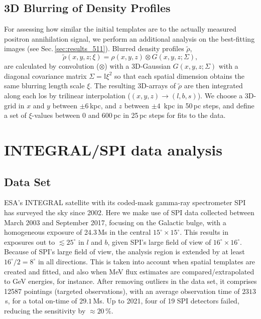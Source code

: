 \documentclass[doublespace,nopageskip]{VTthesis}
\begin{document}
\subsection{3D Blurring of Density Profiles}\label{sec:blurring_maps}
%
For assessing how similar the initial templates are to the actually measured positron annihilation signal, we perform an additional analysis on the best-fitting images (see Sec.\,\ref{sec:results_511}).
%
Blurred density profiles $\tilde{\rho}$,
%
\begin{equation}
	\tilde{\rho}(x,y,z;\xi) = \rho(x,y,z) \otimes G(x,y,z;\Sigma)\mathrm{,} 
	\label{eq:3Dblurring}
\end{equation}
%
\noindent are calculated by convolution ($\otimes$) with a 3D-Gaussian  $G(x,y,z;\Sigma)$ with a diagonal covariance matrix $\Sigma = \mathbb{I}\xi^2$ so that each spatial dimension obtains the same blurring length scale $\xi$.
%
The resulting 3D-arrays of $\tilde{\rho}$ are then integrated along each los by trilinear interpolation ($(x,y,z) \rightarrow (l,b,s)$).
%
We choose a 3D-grid in $x$ and $y$ between $\pm 6$\,kpc, and $z$ between $\pm 4$\, kpc in 50\,pc steps, and define a set of $\xi$-values between 0 and 600\,pc in 25\,pc steps for fits to the data.




\section{INTEGRAL/SPI data analysis}\label{sec:data_analysis}
%
\subsection{Data Set}\label{sec:data_set}
%
ESA's INTEGRAL satellite \citep{2003A&A...411L...1W} with its coded-mask gamma-ray spectrometer SPI \citep{2003A&A...411L..63V} has surveyed the sky since 2002. 
%
Here we make use of SPI data collected between March 2003 and September 2017, focusing on the Galactic bulge, with a homogeneous exposure of 24.3\,Ms in the central $15^{\circ} \times 15^{\circ}$.
%
This results in exposures out to $\lesssim 25^{\circ}$ in $l$ and $b$, given SPI's large field of view of $16^{\circ} \times 16^{\circ}$. 
%
Because of SPI's large field of view, the analysis region is extended by at least $16^{\circ}/2 = 8^{\circ}$ in all directions.
%
This is taken into account when spatial templates are created and fitted, and also when MeV flux estimates are compared/extrapolated to GeV energies, for instance.
%
After removing outliers in the data set, it comprises 12587 pointings (targeted observations), with an average observation time of $2313$\,s, for a total on-time of $29.1$\,Ms.
%
Up to 2021, four of 19 SPI detectors failed, reducing the sensitivity by $\approx 20\,\%$.
\end{document}
